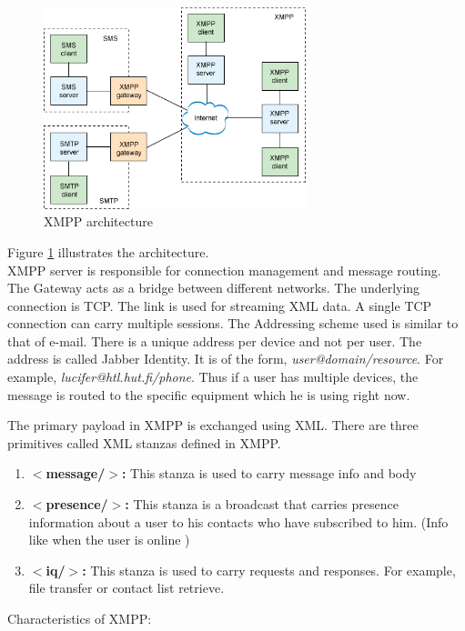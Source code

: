 \documentclass[12pt, conference, a4paper]{article}
\begin{document}
\begin{figure}[!htbp]
\begin{center}
  \includegraphics[width=3in]{xmpp_architecture.png}
\caption{XMPP architecture \cite{xmpp-arch}}
\label{fig: xmpp} 
\end{center}
\end{figure}
Figure \ref{fig: xmpp} illustrates the architecture.\\
XMPP server is responsible for connection management and message routing. The Gateway acts as a bridge between different networks. The underlying connection is TCP. The link is used for streaming XML data. A single TCP connection can carry multiple sessions. The Addressing scheme used is similar to that of e-mail. There is a unique address per device and not per user. The address is called Jabber Identity. It is of the form, \textit{user@domain/resource}. For example, \textit{lucifer@htl.hut.fi/phone}. Thus if a user has multiple devices, the message is routed to the specific equipment which he is using right now.
\par
The primary payload in XMPP is exchanged using XML. There are three primitives called XML stanzas defined in XMPP.
\begin{enumerate}
    \item \textbf{$<$message/$>$:} This stanza is used to carry message info and body
    \item \textbf{$<$presence/$>$:} This stanza is a broadcast that carries presence information about a user to his contacts who have subscribed to him. (Info like when the user is online )
    \item \textbf{$<$iq/$>$:} This stanza is used to carry requests and responses. For example, file transfer or contact list retrieve. 
\end{enumerate}
\par
Characteristics of XMPP:
\end{document}
